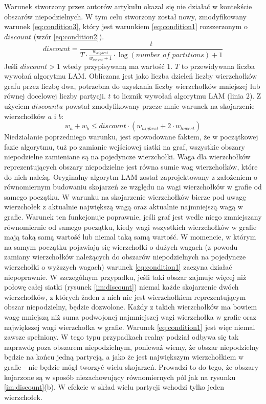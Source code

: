 Warunek stworzony przez autorów artykułu \cite{weighted_maching} okazał się nie działać w kontekście obszarów
niepodzielnych.
W tym celu stworzony został nowy, zmodyfikowany warunek \ref{eq:condition3}, który jest warunkiem \ref{eq:condition1}
rozszerzonym o $discount$ (wzór \ref{eq:condition2}).
\begin{equation}
discount = \frac{t}{T \cdot \frac{w_{highest}}{w_{lowest} + 1} \cdot \log(number\_of\_partitions) + 1}
\label{eq:condition2}
\end{equation}
Jeśli $discount > 1$ wtedy przypisywaną ma wartość 1.
$T$ to przewidywana liczba wywołań algorytmu LAM.
Obliczana jest jako liczba dzieleń liczby wierzchołków grafu przez liczbę dwa, potrzebna do uzyskania liczby wierzchołków mniejszej
lub równej docelowej liczby partycji.
$t$ to licznik wywołań algorytmu LAM (linia $2$).
Z użyciem $discountu$ powstał zmodyfikowany przeze mnie warunek na skojarzenie wierzchołków $a$ i $b$:
\begin{equation}
w_{a} + w_{b} \leq discount \cdot (w_{highest} + 2 \cdot w_{lowest})
\label{eq:condition3}
\end{equation}
Niedziałanie poprzedniego warunku, jest spowodowane faktem,
że w początkowej fazie algorytmu, tuż po zamianie wejściowej siatki na graf,
wszystkie obszary niepodzielne zamieniane są na pojedyncze wierzchołki.
Waga dla wierzchołków reprezentujących obszary niepodzielne jest równa sumie wag wierzchołków, które do nich należą.
Oryginalny algorytm LAM został zaprojektowany z założeniem o równomiernym budowaniu skojarzeń ze względu na wagi wierzchołków w grafie
od samego początku.
W warunku na skojarzenie wierzchołków bierze pod uwagę wierzchołek z aktualnie największą wagą
oraz aktualnie najmniejszą wagą w grafie.
Warunek ten funkcjonuje poprawnie, jeśli graf jest wedle niego zmniejszany równomiernie od samego początku, kiedy wagi wszystkich
wierzchołków w grafie mają taką samą wartość lub niemal taką samą wartość.
W momencie, w którym na samym początku pojawiają się wierzchołki o dużych wagach (z powodu zamiany wierzchołków
należących do obszarów niepodzielnych na pojedyncze wierzchołki o wyższych wagach) warunek \ref{eq:condition1} zaczyna
działać niepoprawnie.
W szczególnym przypadku, jeśli taki obszar zajmuje więcej niż połowę całej siatki
(rysunek \ref{im:discount}) niemal każde skojarzenie dwóch wierzchołków, z których żaden z nich nie jest wierzchołkiem
reprezentującym obszar niepodzielny, będzie dozwolone.
Każdy z takich wierzchołków ma bowiem wagę mniejszą niż suma podwojonej najmniejszej wagi wierzchołka w grafie oraz największej
wagi wierzchołka w grafie.
Warunek \ref{eq:condition1} jest więc niemal zawsze spełniony.
W tego typu przypadkach realny podział odbywa się tak naprawdę poza obszarem niepodzielnym, ponieważ wiemy, że obszar
niepodzielny będzie na końcu jedną partycją, a jako że jest największym wierzchołkiem w grafie - nie będzie mógł tworzyć
wielu skojarzeń.
Prowadzi to do tego, że obszary kojarzone są w sposób niezachowujący równomiernych pól jak na rysunku \ref{im:discount}(b).
W efekcie w skład wielu partycji wchodzi tylko jeden wierzchołek.

